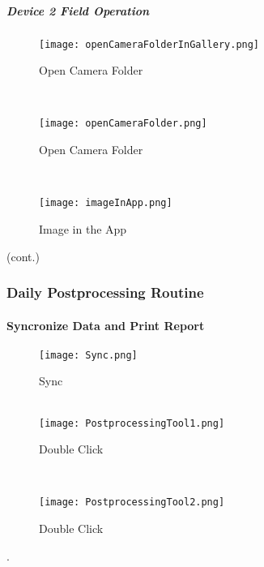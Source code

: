 \clearpage
\subparagraph*{Device 2 Field Operation}
\begin{wrapfigure}{r}{0.4\textwidth}
\centering
    \texttt{[image: openCameraFolderInGallery.png]}
\vspace{-.1in}

\caption {Open Camera Folder}
\vspace{.05in}

\HRule \\[.4cm] %
\vspace{.05in}

    \texttt{[image: openCameraFolder.png]}
\vspace{-.1in}

\caption{Open Camera Folder}
\vspace{.1in}

\HRule \\[.4cm] %
\vspace{.05in}

    \texttt{[image: imageInApp.png]}
\vspace{-.1in}

\caption{Image in the App}
\end{wrapfigure}

(cont.)
\vspace{1in}

\vspace{2.5in}

\vspace{2.25in}

\clearpage
\subsubsection{Daily Postprocessing Routine}
\paragraph{Syncronize Data and Print Report}

\begin{wrapfigure}{r}{0.5\textwidth}
\centering
    \texttt{[image: Sync.png]}
\caption{Sync}
\vspace{.05in}

\HRule \\[.4cm] %
\vspace{.05in}
    \texttt{[image: PostprocessingTool1.png]}
\caption{Double Click}
\vspace{.05in}

\HRule \\[.4cm] %
\vspace{.15in}


    \texttt{[image: PostprocessingTool2.png]}
\caption{Double Click}
\end{wrapfigure}
.

